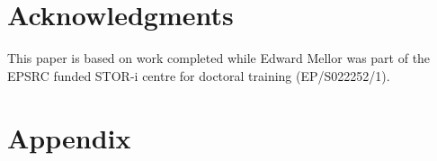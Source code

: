 \documentclass[11pt,a4paper]{article}
\begin{document}

\section{Acknowledgments}
This paper is based on work completed while Edward Mellor was part of the EPSRC funded STOR-i centre for doctoral training (EP/S022252/1). 




\section{Appendix}


\end{document}

